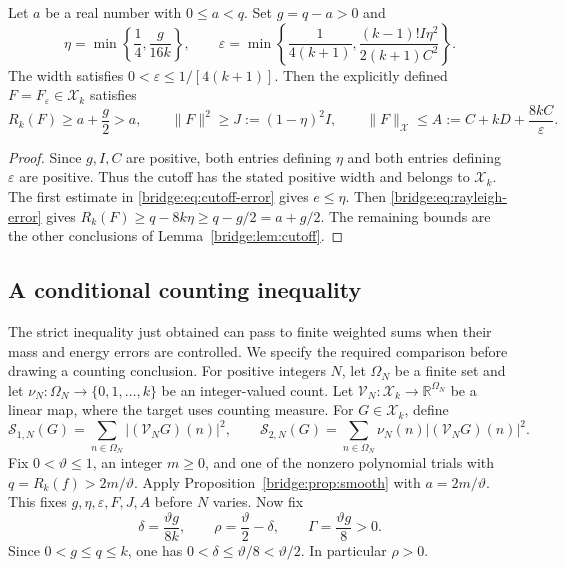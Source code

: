 \documentclass[11pt]{article}
\newcommand{\norm}[1]{\lVert #1\rVert}
\begin{document}
\begin{proposition}
Let\label{bridge:prop:smooth} $a$ be a real number with $0\leq a<q$.
Set $g=q-a>0$ and
\begin{equation}\label{bridge:eq:choices}
 \eta=\min\left\{\frac14,\frac{g}{16k}\right\},\qquad
 \varepsilon=\min\left\{\frac1{4(k+1)},
                    \frac{(k-1)!I\eta^2}{2(k+1)C^2}\right\}.
\end{equation}
The width satisfies $0<\varepsilon\leq1/[4(k+1)]$.
Then the explicitly defined $F=F_\varepsilon\in\mathcal X_k$ satisfies
\begin{equation}\label{bridge:eq:strict-smooth}
 R_k(F)\geq a+\frac g2>a,\qquad
 \norm F^2\geq J:=(1-\eta)^2I,
 \qquad \norm F_{\mathcal X}\leq A:=C+kD+\frac{8kC}{\varepsilon}.
\end{equation}
\end{proposition}

\begin{proof}
Since $g,I,C$ are positive, both entries defining $\eta$ and both entries
defining $\varepsilon$ are positive.  Thus the cutoff has the stated
positive width and belongs to $\mathcal X_k$.
The first estimate in \eqref{bridge:eq:cutoff-error} gives $e\leq\eta$.
Then \eqref{bridge:eq:rayleigh-error} gives
$R_k(F)\geq q-8k\eta\geq q-g/2=a+g/2$.
The remaining bounds are the other conclusions of
Lemma~\ref{bridge:lem:cutoff}.
\end{proof}

\subsection{A conditional counting inequality}

The strict inequality just obtained can pass to finite weighted sums
when their mass and energy errors are controlled.
We specify the required comparison before drawing a counting conclusion.
For positive integers $N$, let $\Omega_N$ be a finite set and let
$\nu_N:\Omega_N\to\{0,1,\ldots,k\}$ be an integer-valued count.
Let $\mathcal V_N:\mathcal X_k\to\mathbb R^{\Omega_N}$ be a linear map,
where the target uses counting measure.
For $G\in\mathcal X_k$, define
\[
 \mathscr S_{1,N}(G)=\sum_{n\in\Omega_N}|(\mathcal V_NG)(n)|^2,
 \qquad
 \mathscr S_{2,N}(G)=\sum_{n\in\Omega_N}\nu_N(n)|(\mathcal V_NG)(n)|^2.
\]
Fix $0<\vartheta\leq1$, an integer $m\geq0$, and one of the nonzero
polynomial trials with $q=R_k(f)>2m/\vartheta$.
Apply Proposition~\ref{bridge:prop:smooth} with $a=2m/\vartheta$.
This fixes $g,\eta,\varepsilon,F,J,A$ before $N$ varies.
Now fix
\begin{equation}\label{bridge:eq:rho-choice}
 \delta=\frac{\vartheta g}{8k},\qquad
 \rho=\frac\vartheta2-\delta,\qquad
 \Gamma=\frac{\vartheta g}{8}>0.
\end{equation}
Since $0<g\leq q\leq k$, one has $0<\delta\leq\vartheta/8<\vartheta/2$.
In particular $\rho>0$.
\end{document}

